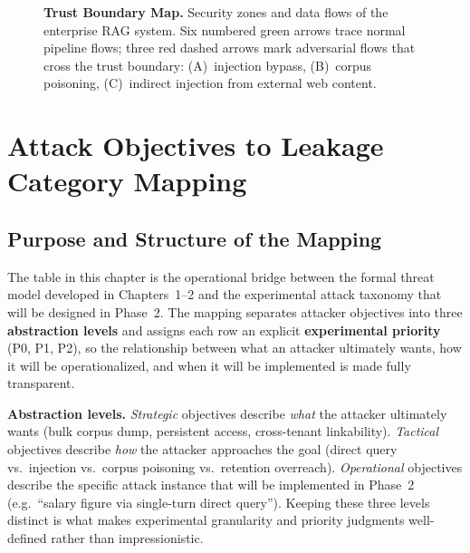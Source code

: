 \documentclass[a4paper,12pt]{report}
\begin{document}
\begin{landscape}
\begin{figure}[p]
\begin{tikzpicture}
\end{tikzpicture}
\hspace{4cm}

\caption{\textbf{Trust Boundary Map.} Security zones and data flows of the
enterprise RAG system. Six numbered green arrows trace normal pipeline
flows; three red dashed arrows mark adversarial flows that cross the trust
boundary: (A)~injection bypass, (B)~corpus poisoning, (C)~indirect injection
from external web content.}
\label{fig:trust-boundary}
\end{figure}
\end{landscape}

\clearpage


\chapter{Attack Objectives to Leakage Category Mapping}

\section{Purpose and Structure of the Mapping}

The table in this chapter is the operational bridge between the formal
threat model developed in Chapters~1--2 and the experimental attack
taxonomy that will be designed in Phase~2. The mapping separates attacker
objectives into three \textbf{abstraction levels} and assigns each row an
explicit \textbf{experimental priority} (P0, P1, P2), so the relationship
between what an attacker ultimately wants, how it will be operationalized,
and when it will be implemented is made fully transparent.

\textbf{Abstraction levels.}
\emph{Strategic} objectives describe \emph{what} the attacker ultimately
wants (bulk corpus dump, persistent access, cross-tenant linkability).
\emph{Tactical} objectives describe \emph{how} the attacker approaches
the goal (direct query vs.\ injection vs.\ corpus poisoning vs.\ retention
overreach). \emph{Operational} objectives describe the specific attack
instance that will be implemented in Phase~2 (e.g.\ ``salary figure via
single-turn direct query''). Keeping these three levels distinct is what
makes experimental granularity and priority judgments well-defined rather
than impressionistic.
\end{document}
